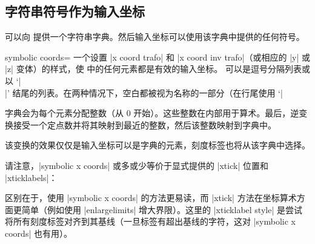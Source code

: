 \subsection{字符串符号作为输入坐标}

可以向 \PGFPlots{} 提供一个字符串字典。然后输入坐标可以使用该字典中提供的任何符号。

\begin{pgfplotsxykeylist}{symbolic \x\space coords=}
    一个设置 |x coord trafo| 和 |x coord inv trafo|（或相应的 |y| 或 |z| 变体）的样式，使  中的任何元素都是有效的输入坐标。 可以是逗号分隔列表或以 `|\\|' 结尾的列表。在两种情况下，空白都被视为名称的一部分（在行尾使用 `|%

    字典会为每个元素分配整数（从 $0$ 开始）。这些整数在内部用于算术。最后，逆变换接受一个定点数并将其映射到最近的整数，然后该整数映射到字典中。
\begin{codeexample}[]
\end{codeexample}

    该变换的效果仅仅是输入坐标可以是字典的元素，刻度标签也将从该字典中选择。

    请注意，|symbolic x coords| 或多或少等价于显式提供的 |xtick| 位置和 |xticklabels|：
\begin{codeexample}[]
\end{codeexample}
    \noindent 区别在于，使用 |symbolic x coords| 的方法更易读，而 |xtick| 方法在坐标算术方面更简单（例如使用 |enlargelimits| 增大界限）。这里的 |xticklabel style| 是尝试将所有刻度标签对齐到其基线（一旦标签有超出基线的字符，这对 |symbolic x coords| 也有用）。


\end{pgfplotsxykeylist}
